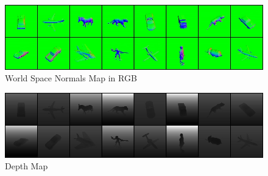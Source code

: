 \documentclass[10pt,twocolumn,letterpaper]{article}
\begin{document}

\begin{figure}[h!]
\centering
\includegraphics[width=1.0\columnwidth]{./assets/synth_world_normals.jpg}
\caption{World Space Normals Map in RGB}
\label{fig:GBUFFER_NORMALS}
\end{figure}

\begin{figure}[h!]
\centering
\includegraphics[width=1.0\columnwidth]{./assets/synth_linear_depth.jpg}
\caption{Depth Map}
\label{fig:GBUFFER_DEPTH}
\end{figure}

\end{document}

